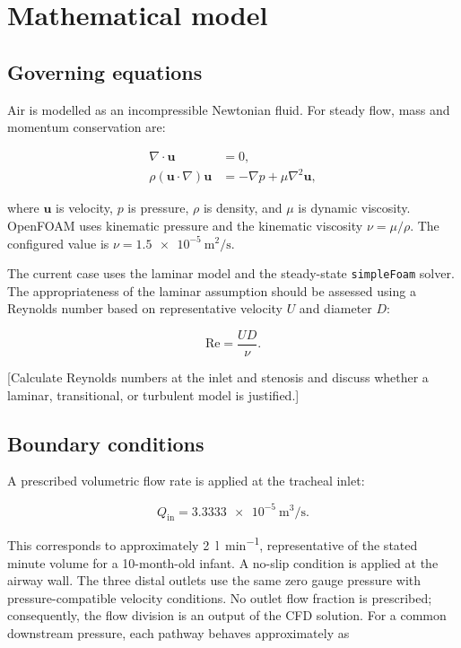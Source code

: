 \documentclass[11pt,a4paper]{article}
\begin{document}
\section{Mathematical model}
\label{sec:model}

\subsection{Governing equations}

Air is modelled as an incompressible Newtonian fluid. For steady flow, mass and
momentum conservation are:

\begin{align}
  \nabla \cdot \mathbf{u} &= 0, \\
  \rho (\mathbf{u}\cdot\nabla)\mathbf{u}
    &= -\nabla p + \mu \nabla^2\mathbf{u},
\end{align}

where $\mathbf{u}$ is velocity, $p$ is pressure, $\rho$ is density, and $\mu$
is dynamic viscosity. OpenFOAM uses kinematic pressure and the kinematic
viscosity $\nu=\mu/\rho$. The configured value is
$\nu=\SI{1.5e-5}{\metre\squared\per\second}$.

The current case uses the laminar model and the steady-state
\texttt{simpleFoam} solver. The appropriateness of the laminar assumption should
be assessed using a Reynolds number based on representative velocity $U$ and
diameter $D$:

\begin{equation}
  \mathrm{Re} = \frac{UD}{\nu}.
\end{equation}

[Calculate Reynolds numbers at the inlet and stenosis and discuss whether a
laminar, transitional, or turbulent model is justified.]

\subsection{Boundary conditions}

A prescribed volumetric flow rate is applied at the tracheal inlet:

\begin{equation}
  Q_{\mathrm{in}} = \SI{3.3333e-5}{\metre\cubed\per\second}.
\end{equation}

This corresponds to approximately \SI{2}{\litre\per\minute}, representative
of the stated minute volume for a 10-month-old infant. A no-slip condition is
applied at the airway wall. The three distal outlets use the same zero gauge
pressure with pressure-compatible velocity conditions. No outlet flow fraction
is prescribed; consequently, the flow division is an output of the CFD solution.
For a common downstream pressure, each pathway behaves approximately as
\end{document}
